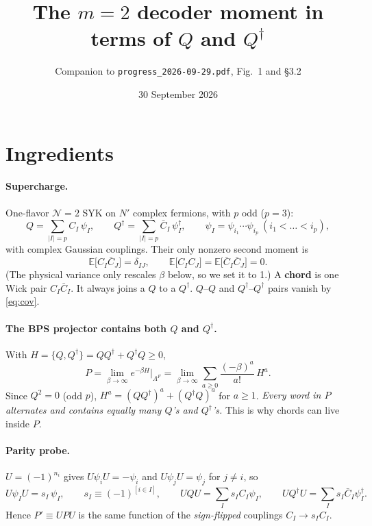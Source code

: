 \documentclass[11pt]{article}
\title{\bf The $m=2$ decoder moment in terms of $Q$ and $Q^\dagger$}
\author{\small Companion to \texttt{progress\_2026-09-29.pdf}, Fig.~1 and \S3.2}
\date{30 September 2026}
\newcommand{\Np}{N'}
\begin{document}
\maketitle

\section{Ingredients}
\paragraph{Supercharge.} One-flavor $\mathcal N{=}2$ SYK on $\Np$ complex fermions, with $p$ odd ($p=3$):
\begin{equation}
Q=\sum_{|I|=p}C_I\,\psi_I,\qquad Q^\dagger=\sum_{|I|=p}\bar C_I\,\psi_I^\dagger,\qquad
\psi_I=\psi_{i_1}\cdots\psi_{i_p}\ (i_1<\dots<i_p),
\end{equation}
with complex Gaussian couplings. Their only nonzero second moment is
\begin{equation}
\mathbb E\big[C_I\bar C_J\big]=\delta_{IJ},\qquad \mathbb E\big[C_IC_J\big]=\mathbb E\big[\bar C_I\bar C_J\big]=0 .
\label{eq:cov}
\end{equation}
(The physical variance only rescales $\beta$ below, so we set it to 1.) A \textbf{chord} is one Wick pair
$C_I\bar C_I$. It always joins a $Q$ to a $Q^\dagger$. $Q$--$Q$ and $Q^\dagger$--$Q^\dagger$ pairs vanish by
\eqref{eq:cov}.

\paragraph{The BPS projector contains both $Q$ and $Q^\dagger$.} With $H=\{Q,Q^\dagger\}=QQ^\dagger+Q^\dagger Q\ge0$,
\begin{equation}
P=\lim_{\beta\to\infty}e^{-\beta H}\Big|_{\Lambda^F}
=\lim_{\beta\to\infty}\sum_{a\ge0}\frac{(-\beta)^a}{a!}\,H^a .
\end{equation}
Since $Q^2=0$ (odd $p$), $H^a=(QQ^\dagger)^a+(Q^\dagger Q)^a$ for $a\ge1$. \emph{Every word in $P$ alternates and contains
equally many $Q$'s and $Q^\dagger$'s.} This is why chords can live inside $P$.

\paragraph{Parity probe.} $U=(-1)^{n_i}$ gives $U\psi_iU=-\psi_i$ and $U\psi_jU=\psi_j$ for $j\neq i$, so
\begin{equation}
U\psi_IU=s_I\,\psi_I,\qquad s_I\equiv(-1)^{[i\in I]},\qquad
UQU=\sum_Is_IC_I\psi_I,\qquad UQ^\dagger U=\sum_Is_I\bar C_I\psi_I^\dagger .
\label{eq:sign}
\end{equation}
Hence $P'\equiv UPU$ is the same function of the \emph{sign-flipped} couplings $C_I\to s_IC_I$.
\end{document}
